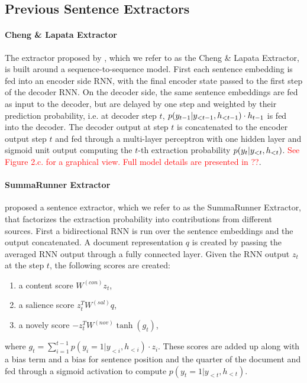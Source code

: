 \subsection{Previous Sentence Extractors}

\paragraph{Cheng \& Lapata Extractor} The extractor proposed by 
\citet{cheng2016neural}, which we refer to as the Cheng \& Lapata Extractor,
is built around a sequence-to-sequence model.
First each sentence embedding is
fed into an encoder side RNN, with the final encoder state passed to the
first step of the decoder RNN. On the decoder side, the same sentence 
embeddings are fed as input to the decoder, but are delayed by one step and 
weighted by their prediction probability, i.e. at decoder step $t$,
$p(\slabel[t-1]|\slabel[<t-1], \sentEmb[<t-1]) \cdot \sentEmb[t-1]$
is fed into the decoder. The decoder output at step $t$ is concatenated 
to the encoder output step $t$ and fed through a multi-layer perceptron
with one hidden layer and sigmoid unit output computing the $t$-th
extraction probability $p(\slabel[t]|\slabel[<t], \sentEmb[<t])$. \textcolor{red}{See Figure 2.c. for a graphical view. Full model details are presented in ??}.

\paragraph{SummaRunner Extractor} \citet{nallapati2017summarunner} proposed
a sentence extractor, which we refer to as the SummaRunner Extractor,
that factorizes the extraction probability into contributions 
from different sources.
First a bidirectional RNN is run over the sentence embeddings and the output
concatenated. A document representation $q$ is created by passing the 
averaged RNN output through a fully connected layer. 
Given the RNN output $z_t$ at the step $t$, the following scores are created:
\begin{enumerate}
\item a content score $W^{(con)}z_t$,
\item a salience score $z_t^TW^{(sal)}q$,
\item a novely score $-z_t^TW^{(nov)}\tanh(g_t)$,
\end{enumerate}
where $g_t = \sum_{i=1}^{t-1} p(y_i=1|y_{<i}, h_{<i}) \cdot z_i$.
These scores are added up along with a bias term and a bias for sentence 
position and the quarter of the document and fed through a sigmoid activation
to compute $p(y_t=1|y_{<t}, h_{<t})$.


